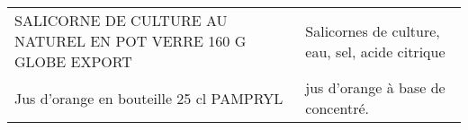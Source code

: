 \begin{longtable}{p{5cm}p{10cm}}
                                          SALICORNE DE CULTURE AU NATUREL EN POT VERRE 160 G GLOBE EXPORT &                                                                                                                                                                                                                                                                                                                                                                                                                                                                                                                                                                                                                                                                                                                                                                                                                                                                                                                                                                                          Salicornes de culture, eau, sel, acide citrique \\
                                                                  Jus d'orange en bouteille 25 cl PAMPRYL &                                                                                                                                                                                                                                                                                                                                                                                                                                                                                                                                                                                                                                                                                                                                                                                                                                                                                                                                                                                                        jus d'orange à base de concentré. \\

\end{longtable}
